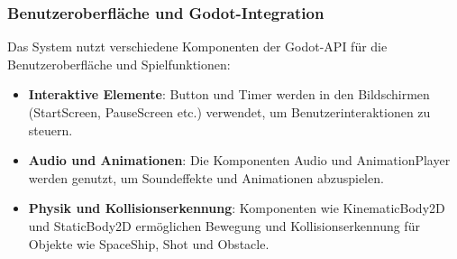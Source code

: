 \documentclass[10pt]{article}
\begin{document}
\subsubsection{Benutzeroberfläche und Godot-Integration}

Das System nutzt verschiedene Komponenten der Godot-API für die Benutzeroberfläche und Spielfunktionen:

\begin{itemize}
    \item \textbf{Interaktive Elemente}: Button und Timer werden in den Bildschirmen (StartScreen, PauseScreen etc.) verwendet, um Benutzerinteraktionen zu steuern.

    \item \textbf{Audio und Animationen}: Die Komponenten Audio und AnimationPlayer werden genutzt, um Soundeffekte und Animationen abzuspielen.

    \item \textbf{Physik und Kollisionserkennung}: Komponenten wie KinematicBody2D und StaticBody2D ermöglichen Bewegung und Kollisionserkennung für Objekte wie SpaceShip, Shot und Obstacle.
\end{itemize}
\end{document}

